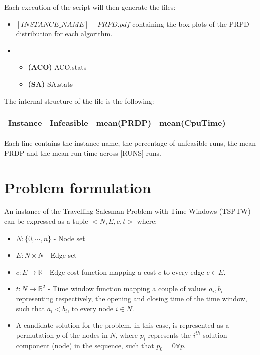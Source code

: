 \documentclass{article}
\begin{document}
Each execution of the script will then generate the files:
\begin{itemize}
  \item $[INSTANCE\_NAME]-PRPD.pdf$ containing the box-plots of the PRPD distribution for each algorithm.
  \item 
        \begin{itemize}
          \item \textbf{(ACO)} ACO.stats 
          \item \textbf{(SA)} SA.stats
        \end{itemize}
\end{itemize}

The internal structure of the file is the following:
\begin{center}
\begin{tabular}{|c|c|c|c|}
\hline
\textbf{Instance}	&	\textbf{Infeasible} & \textbf{mean(PRDP)} &	\textbf{mean(CpuTime)} \\ \hline
\end{tabular}
\end{center}

Each line contains the instance name, the percentage of unfeasible runs, the mean PRDP and the mean run-time across [RUNS] runs.

\section{Problem formulation}
An instance of the Travelling Salesman Problem with Time Windows (TSPTW) can be expressed as a tuple $<N,E,c,t>$ where:
\begin{itemize}
  \item $N:\{0,\cdots,n\}$ - Node set 
  \item $E:N\times N$ - Edge set
  \item $c:E\mapsto \mathbb{R}$ - Edge cost function mapping a cost $c$ to every edge $e \in E$. 
  \item $t:N\mapsto \mathbb{R}^2$ - Time window function mapping a couple of values $a_i,b_i$ representing respectively, the opening and closing time of the time window, such that $a_i<b_i$, to every node $i \in N$.
  \item A candidate solution for the problem, in this case, is represented as a permutation $p$ of the nodes in $N$, where $p_i$ represents the $i^{th}$ solution component (node) in the sequence, such that $p_0 = 0 \forall p$.
\end{itemize}
\end{document}
